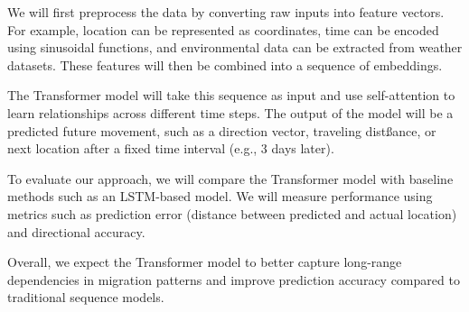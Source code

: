 \documentclass{article}
\begin{document}
We will first preprocess the data by converting raw inputs into feature vectors. For example, location can be represented as coordinates, time can be encoded using sinusoidal functions, and environmental data can be extracted from weather datasets. These features will then be combined into a sequence of embeddings.

The Transformer model will take this sequence as input and use self-attention to learn relationships across different time steps. The output of the model will be a predicted future movement, such as a direction vector, traveling distßance, or next location after a fixed time interval (e.g., 3 days later).

To evaluate our approach, we will compare the Transformer model with baseline methods such as an LSTM-based model. We will measure performance using metrics such as prediction error (distance between predicted and actual location) and directional accuracy.

Overall, we expect the Transformer model to better capture long-range dependencies in migration patterns and improve prediction accuracy compared to traditional sequence models.


\clearpage

\end{document}

